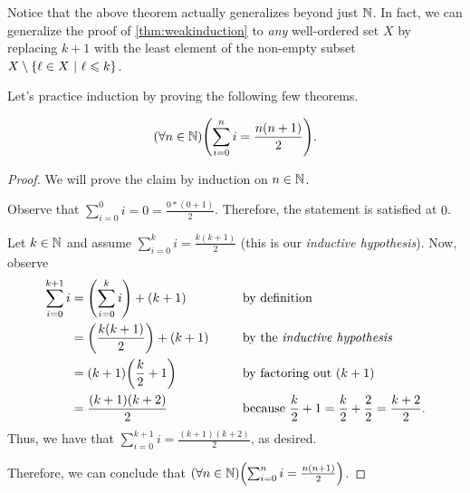 Notice that the above theorem actually generalizes beyond just $\mathbb{N}$.
In fact, we can generalize the proof of \autoref{thm:weakinduction}
to \emph{any} well-ordered set $X$ by replacing $k + 1$
with the least element of the non-empty subset $X \setminus \set*{\ell \in X \suchthat \ell \leq k}$.

Let's practice induction by proving the following few theorems.
\begin{theorem}\label{thm:gaussiansum}
    \[
        \pn*{\forall n \in \N}\pn*{\sum_{i = 0}^{n}i = \frac{n(n + 1)}{2}}.
    \]
\end{theorem}
\begin{proof}
    We will prove the claim by induction on \(n \in \mathbb{N}\).

    \begin{case}
        Observe that \(\sum_{i = 0}^{0}i = 0 = \frac{0*(0 + 1)}{2}\).
        Therefore, the statement is satisfied at \(0\).
    \end{case}

    \begin{case}
        Let \(k \in \mathbb{N}\) and assume \(\sum_{i = 0}^{k}i = \frac{k(k + 1)}{2}\)
        (this is our \emph{inductive hypothesis}).
        Now, observe
        \begin{alignat*}{2}
            \sum_{i = 0}^{k + 1}i &= \pn*{\sum_{i = 0}^{k}i} + (k + 1) &&\text{ by definition}\\
                                  &= \pn*{\frac{k(k + 1)}{2}} + (k + 1)~~~~&&\text{ by the \emph{inductive hypothesis}}\\
                                  &= (k + 1)\pn*{\frac{k}{2} + 1} &&\text{ by factoring out } (k + 1)\\
                                  &= \frac{(k + 1)(k + 2)}{2} &&\text{ because } \frac{k}{2} + 1 = \frac{k}{2} + \frac{2}{2} = \frac{k + 2}{2}.
        \end{alignat*}
        Thus, we have that \(\sum_{i = 0}^{k + 1}i = \frac{(k + 1)(k + 2)}{2}\), as desired.
    \end{case}

    Therefore, we can conclude that \(\pn*{\forall n \in \N}\pn*{\sum_{i = 0}^{n}i = \frac{n(n + 1)}{2}}\).
\end{proof}

